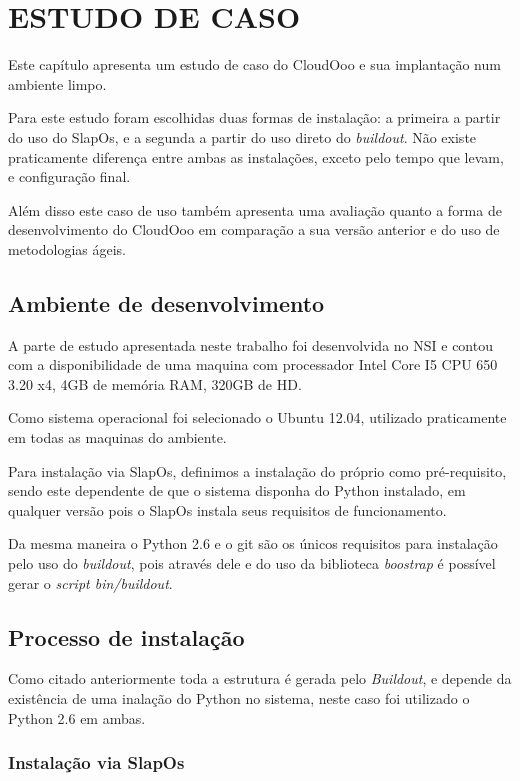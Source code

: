 \chapter{ESTUDO DE CASO}
\thispagestyle{empty}

Este capítulo apresenta um estudo de caso do CloudOoo e sua implantação num ambiente limpo.

Para este estudo foram escolhidas duas formas de instalação: a primeira a partir do uso do SlapOs, e a segunda a partir do uso direto do \textit{buildout}. Não existe praticamente diferença entre ambas as instalações, exceto pelo tempo que levam, e configuração final.

Além disso este caso de uso também apresenta uma avaliação quanto a forma de desenvolvimento do CloudOoo em comparação a sua versão anterior e do uso de metodologias ágeis.

\section{Ambiente de desenvolvimento}

A parte de estudo apresentada neste trabalho foi desenvolvida no NSI e contou com a disponibilidade de uma maquina com processador Intel Core I5 CPU 650 3.20 x4, 4GB de memória RAM, 320GB de HD.

Como sistema operacional foi selecionado o Ubuntu 12.04, utilizado praticamente em todas as maquinas do ambiente.

Para instalação via SlapOs, definimos a instalação do próprio como pré-requisito, sendo este dependente de que o sistema disponha do Python instalado, em qualquer versão pois o SlapOs instala seus requisitos de funcionamento.

Da mesma maneira o Python 2.6 e o git são os únicos requisitos para instalação pelo uso do \textit{buildout}, pois através dele e do uso da biblioteca \textit{boostrap} é possível gerar o \textit{script bin/buildout}.

\section{Processo de instalação}

Como citado anteriormente toda a estrutura é gerada pelo \textit{Buildout}, e depende da existência de uma inalação do Python no sistema, neste caso foi utilizado o Python 2.6 em ambas.

\subsection{Instalação via SlapOs}

